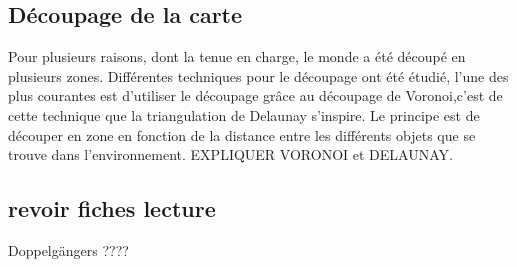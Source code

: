 	\subsection{Découpage de la carte}
	Pour plusieurs raisons, dont la tenue en charge, le monde a été découpé en plusieurs zones. Différentes techniques pour le découpage ont été étudié, l'une des plus courantes est d'utiliser le découpage grâce au découpage de Voronoi,c'est de cette technique que la triangulation de Delaunay s'inspire. Le principe est de découper en zone en fonction de la distance entre les différents objets que se trouve dans l'environnement. EXPLIQUER VORONOI et DELAUNAY.\\


	\subsection{revoir fiches lecture} 

	Doppelgängers ????
